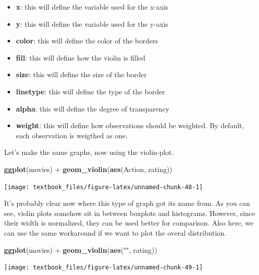 \documentclass[]{tufte-book}
\newenvironment{Shaded}{}{}
\newcommand{\KeywordTok}[1]{\textcolor[rgb]{0.00,0.44,0.13}{\textbf{#1}}}
\newcommand{\NormalTok}[1]{#1}
\newcommand{\OperatorTok}[1]{\textcolor[rgb]{0.40,0.40,0.40}{#1}}
\newcommand{\StringTok}[1]{\textcolor[rgb]{0.25,0.44,0.63}{#1}}
\providecommand{\tightlist}{%
  \setlength{\itemsep}{0pt}\setlength{\parskip}{0pt}}
\begin{document}
\begin{itemize}
\tightlist
\item
  \textbf{x}: this will define the variable used for the x-axis
\item
  \textbf{y}: this will define the variable used for the y-axis
\item
  \textbf{color}: this will define the color of the borders
\item
  \textbf{fill}: this will define how the violin is filled
\item
  \textbf{size}: this will define the size of the border
\item
  \textbf{linetype}: this will define the type of the border
\item
  \textbf{alpha}: this will define the degree of transparency
\item
  \textbf{weight}: this will define how observations should be weighted. By default, each observation is weigthed as one.
\end{itemize}

Let's make the same graphs, now using the violin-plot.

\begin{Shaded}
\begin{Highlighting}[]
\KeywordTok{ggplot}\NormalTok{(movies) }\OperatorTok{+}\StringTok{ }
\StringTok{    }\KeywordTok{geom_violin}\NormalTok{(}\KeywordTok{aes}\NormalTok{(Action, rating))}
\end{Highlighting}
\end{Shaded}

\texttt{[image: textbook\_files/figure-latex/unnamed-chunk-48-1]}

It's probably clear now where this type of graph got its name from. As you can see, violin plots somehow sit in between boxplots and histograms. However, since their width is normalized, they can be used better for comparison. Also here, we can use the same workaround if we want to plot the overal distribution.

\begin{Shaded}
\begin{Highlighting}[]
\KeywordTok{ggplot}\NormalTok{(movies) }\OperatorTok{+}
\StringTok{    }\KeywordTok{geom_violin}\NormalTok{(}\KeywordTok{aes}\NormalTok{(}\StringTok{""}\NormalTok{, rating))}
\end{Highlighting}
\end{Shaded}

\texttt{[image: textbook\_files/figure-latex/unnamed-chunk-49-1]}
\end{document}
